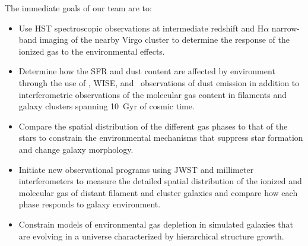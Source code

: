\documentclass[11pt]{article}
\begin{document}
The immediate goals of our team are to:
\vspace{-0.1in}
\begin{itemize}
\item Use HST  spectroscopic  observations at  intermediate redshift and H$\alpha$ narrow-band imaging of the nearby Virgo cluster to determine the response of the ionized gas to the environmental effects.
\vspace{-0.1in}
\item Determine how the SFR and dust content are
  affected by environment through the use of \spitzer, WISE, and \herschel\ observations of
  dust emission in addition to interferometric observations of
  the molecular gas content in filaments and galaxy clusters spanning 10~Gyr of
  cosmic time.
\vspace{-0.1in}
\item Compare the spatial distribution of the different gas phases to that of the stars to constrain the environmental mechanisms that suppress star formation and change galaxy morphology.
\vspace{-0.1in}
\item Initiate new observational programs using JWST and millimeter interferometers to measure the detailed spatial distribution of the ionized and molecular gas of distant filament and cluster galaxies and compare how each phase responds to galaxy environment.
\vspace{-0.1in}
\item Constrain models of environmental gas depletion in simulated galaxies that are evolving in a universe characterized by hierarchical structure growth.
\end{itemize}
\vspace{-0.1in}

\end{document}
